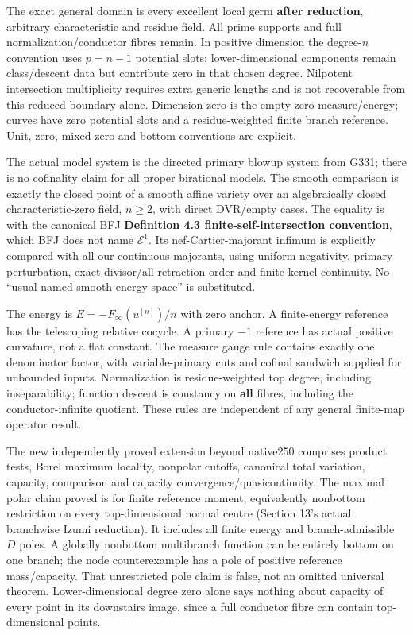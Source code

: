\documentclass[
]{article}
\begin{document}
The exact general domain is every excellent local germ \textbf{after
reduction}, arbitrary characteristic and residue field. All prime
supports and full normalization/conductor fibres remain. In positive
dimension the degree-\(n\) convention uses \(p=n-1\) potential slots;
lower-dimensional components remain class/descent data but contribute
zero in that chosen degree. Nilpotent intersection multiplicity requires
extra generic lengths and is not recoverable from this reduced boundary
alone. Dimension zero is the empty zero measure/energy; curves have zero
potential slots and a residue-weighted finite branch reference. Unit,
zero, mixed-zero and bottom conventions are explicit.

The actual model system is the directed primary blowup system from G331;
there is no cofinality claim for all proper birational models. The
smooth comparison is exactly the closed point of a smooth affine variety
over an algebraically closed characteristic-zero field, \(n\ge2\), with
direct DVR/empty cases. The equality is with the canonical BFJ
\textbf{Definition 4.3 finite-self-intersection convention}, which BFJ
does not name \(\mathcal E^1\). Its nef-Cartier-majorant infimum is
explicitly compared with all our continuous majorants, using uniform
negativity, primary perturbation, exact divisor/all-retraction order and
finite-kernel continuity. No ``usual named smooth energy space'' is
substituted.

The energy is \(E=-F_\infty(u^{[n]})/n\) with zero anchor. A
finite-energy reference has the telescoping relative cocycle. A primary
\(-1\) reference has actual positive curvature, not a flat constant. The
measure gauge rule contains exactly one denominator factor, with
variable-primary cuts and cofinal sandwich supplied for unbounded
inputs. Normalization is residue-weighted top degree, including
inseparability; function descent is constancy on \textbf{all} fibres,
including the conductor-infinite quotient. These rules are independent
of any general finite-map operator result.

The new independently proved extension beyond native250 comprises
product tests, Borel maximum locality, nonpolar cutoffs, canonical total
variation, capacity, comparison and capacity
convergence/quasicontinuity. The maximal polar claim proved is for
finite reference moment, equivalently nonbottom restriction on every
top-dimensional normal centre (Section 13's actual branchwise Izumi
reduction). It includes all finite energy and branch-admissible \(D\)
poles. A globally nonbottom multibranch function can be entirely bottom
on one branch; the node counterexample has a pole of positive reference
mass/capacity. That unrestricted pole claim is false, not an omitted
universal theorem. Lower-dimensional degree zero alone says nothing
about capacity of every point in its downstairs image, since a full
conductor fibre can contain top-dimensional points.
\end{document}
